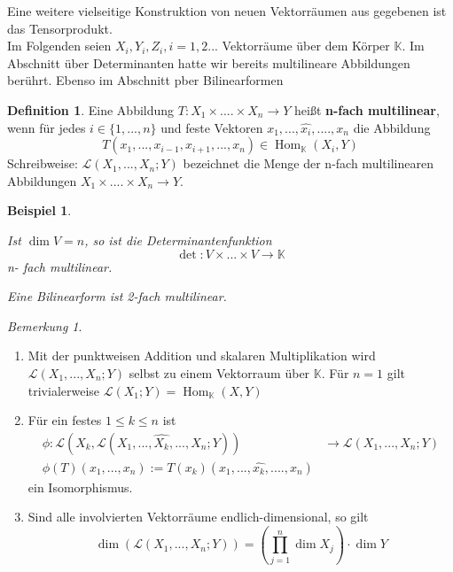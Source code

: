 \documentclass[12pt,a4paper]{article}
\newtheorem*{example}{Beispiel}
\theoremstyle{definition}
\newtheorem{definition}[theorem]{Definition}
\theoremstyle{remark}
\newtheorem*{remark}{Bemerkung}
\renewcommand{\hat}[1]{\widehat{#1}}
\DeclareMathOperator{\Hom}{Hom}
\begin{document}
	Eine weitere vielseitige Konstruktion von neuen Vektorräumen aus gegebenen ist das Tensorprodukt. \\
	Im Folgenden seien $X_i, Y_i, Z_i, i = 1,2...$ Vektorräume über dem Körper $\mathbb{K}$. Im Abschnitt über Determinanten hatte wir bereits multilineare Abbildungen berührt. Ebenso im Abschnitt pber Bilinearformen
	\begin{definition}
		Eine Abbildung $T: X_1 \times .... \times X_n \rightarrow Y$ heißt \textbf{n-fach multilinear}, wenn für jedes $i \in \{ 1,...,n \}$ und feste Vektoren $x_1,..., \hat{x_i},....,x_n$ die Abbildung
		\begin{equation}
			T(x_1,...,x_{i-1},x_{i+1},...,x_n) \in \Hom_{\mathbb{K}}(X_i,Y)
		\end{equation}
		Schreibweise: $\mathcal{L}(X_1,...,X_n;Y)$ bezeichnet die Menge der n-fach multilinearen Abbildungen $X_1 \times .... \times X_n \rightarrow Y$.
	\end{definition}
	\begin{example}
		\begin{proofenum} 
			\item 
				Ist $\dim V = n$, so ist die Determinantenfunktion
				\begin{equation}
					\det : V \times ... \times V \rightarrow \mathbb{K}
				\end{equation}
			 	n- fach multilinear.
			 \item 
			 	Eine Bilinearform ist 2-fach multilinear. 
		\end{proofenum}
	\end{example}
	\begin{remark}
		\begin{enumerate}
			\item 
				Mit der punktweisen Addition und skalaren Multiplikation wird $\mathcal{L}(X_1,...,X_n;Y)$ selbst zu einem Vektorraum über $\mathbb{K}$. Für $n=1$ gilt trivialerweise $\mathcal{L}(X_1;Y)=\Hom_{\mathbb{K}}(X,Y)$
			\item
				Für ein festes $1 \leq k \leq n$ ist
				\begin{equation*}
					\begin{split}
						\phi : \mathcal{L}(X_k, \mathcal{L}(X_1,...,\hat{X_k},...,X_n;Y)) &\rightarrow \mathcal{L}(X_1,...,X_n;Y) \\
						\phi(T)(x_1,...,x_n) := T(x_k)(x_1,...,\hat{x_k},....,x_n)
					\end{split}
				\end{equation*}
				ein Isomorphismus.
			\item
				Sind alle involvierten Vektorräume endlich-dimensional, so gilt
				\begin{equation}
					\dim \left( \mathcal{L}(X_1,...,X_n;Y) \right) = \left( \prod_{j = 1}^n \dim X_j \right) \cdot \dim Y
				\end{equation}
		\end{enumerate}
	\end{remark}
\end{document}
